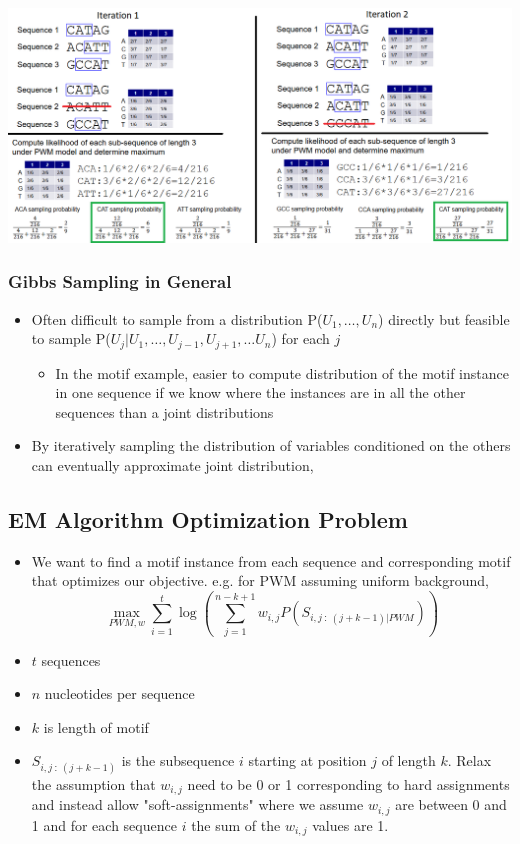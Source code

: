 \documentclass[10pt]{article}
\begin{document}
\begin{center}
    \includegraphics*[width=\textwidth]{W7_29.png}
\end{center}

\subsubsection*{Gibbs Sampling in General}
\begin{itemize}
    \item Often difficult to sample from a distribution P($U_1, \dots, U_n$) directly but feasible to sample P($U_j | U_1, \dots, U_{j - 1}, U_{j + 1}, \dots U_n$) for each $j$
    \begin{itemize}
        \item In the motif example, easier to compute distribution of the motif instance in one sequence if we know where the instances are in all the other sequences than a joint distributions
    \end{itemize}
    \item By iteratively sampling the distribution of variables conditioned on the others can eventually approximate joint distribution,
\end{itemize}

\subsection*{EM Algorithm Optimization Problem}
\begin{itemize}
    \item We want to find a motif instance from each sequence and corresponding motif that optimizes our objective.  e.g. for PWM assuming uniform background,
    \[\max_{PWM, w} \sum_{i = 1}^t \log\left(\sum_{j = 1}^{n - k + 1} w_{i, j} P(S_{i, j \::\: (j + k - 1) | PWM})\right)\]    
    \item $t$ sequences
    \item $n$ nucleotides per sequence
    \item $k$ is length of motif
    \item $S_{i, j \::\: (j + k - 1)}$ is the subsequence $i$ starting at position $j$ of length $k$.  Relax the assumption that $w_{i, j}$ need to be 0 or 1 corresponding to hard assignments and instead allow "soft-assignments" where we assume $w_{i, j}$ are between 0 and 1 and for each sequence $i$ the sum of the $w_{i, j}$ values are 1.
\end{itemize}
\end{document}
